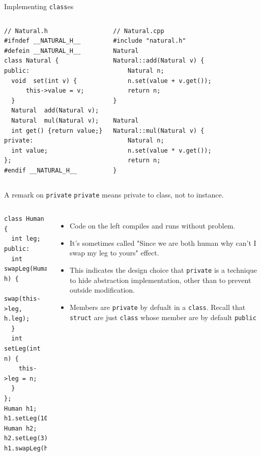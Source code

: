 \begin{frame}[fragile]{Implementing \texttt{class}es}
\begin{columns}[]
	
	\vspace{-.3in}
	\begin{verbatim}
// Natural.h
#ifndef __NATURAL_H__
#defein __NATURAL_H__
class Natural {
public:
  void  set(int v) {
      this->value = v;
  }
  Natural  add(Natural v);
  Natural  mul(Natural v);
  int get() {return value;}
private:
  int value;
};
#endif __NATURAL_H__
	\end{verbatim}
	
	
	\vspace{-.3in}

\begin{verbatim}
// Natural.cpp
#include "natural.h"
Natural 
Natural::add(Natural v) {
    Natural n; 
    n.set(value + v.get());
    return n;
}

Natural 
Natural::mul(Natural v) {
    Natural n; 
    n.set(value * v.get());
    return n;
}
\end{verbatim}
\end{columns}
\end{frame}



\begin{frame}[fragile]{A remark on \texttt{private}}
\texttt{private} means private to class, not to instance. 
\begin{columns}[]
	
\vspace{-.2in}
\begin{verbatim}
class Human {
  int leg;
public:
  int swapLeg(Human& h) {
    swap(this->leg, h.leg);
  }
  int setLeg(int n) {
    this->leg = n;
  }
};
Human h1; h1.setLeg(10);
Human h2; h2.setLeg(3);
h1.swapLeg(h2);
\end{verbatim}
	
	
	\vspace{-.2in}
	\begin{itemize}
		\item Code on the left compiles and runs without problem.
		\item It's sometimes called "Since we are both human why can't I swap my leg to yours" effect.
		\item This indicates the design choice that \texttt{private} is a technique to hide abstraction implementation, other than to prevent outside modification. 
		\item Members are \alert{\texttt{private} by defualt} in a \texttt{class}. Recall that \texttt{struct} are just \texttt{class} whose member are by default \texttt{public}
	\end{itemize}
\end{columns}
\end{frame}

